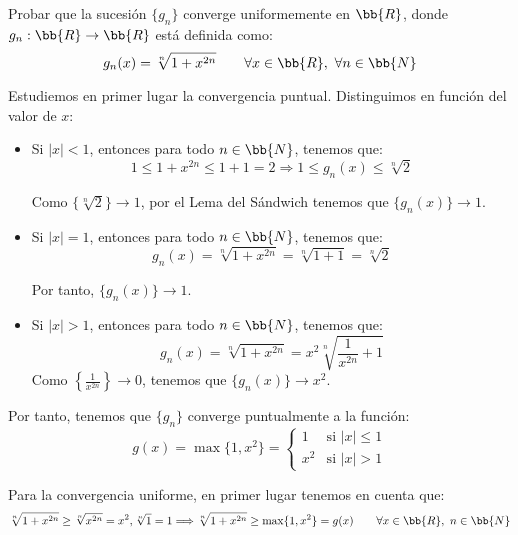 \begin{ejercicio}
    Probar que la sucesión $\{g_n\}$ converge uniformemente en $\bb{R}$, donde $g_n:\bb{R}\to \bb{R}$ está definida como:
    \begin{equation*}
        g_n(x) = \sqrt[n]{1+x^{2n}} \qquad \forall x\in \bb{R},~\forall n\in \bb{N}
    \end{equation*}

    Estudiemos en primer lugar la convergencia puntual. Distinguimos en función
    del valor de $x$:
    \begin{itemize}
        \item Si $|x| < 1$, entonces para todo $n\in \bb{N}$, tenemos que:
        \begin{equation*}
            1 \leq 1+x^{2n} \leq 1+1 = 2 \Longrightarrow 1 \leq g_n(x) \leq \sqrt[n]{2}
        \end{equation*}

        Como $\{\sqrt[n]{2}\}\to 1$, por el Lema del Sándwich tenemos que $\{g_n(x)\}\to 1$.

        \item Si $|x| = 1$, entonces para todo $n\in \bb{N}$, tenemos que:
        \begin{equation*}
            g_n(x) = \sqrt[n]{1+x^{2n}} = \sqrt[n]{1+1} = \sqrt[n]{2}
        \end{equation*}

        Por tanto, $\{g_n(x)\}\to 1$.

        \item Si $|x| > 1$, entonces para todo $n\in \bb{N}$, tenemos que:
        \begin{equation*}
            g_n(x) = \sqrt[n]{1+x^{2n}} = x^2\sqrt[n]{\frac{1}{x^{2n}}+1}
        \end{equation*}
        Como $\left\{\frac{1}{x^{2n}}\right\}\to 0$, tenemos que $\{g_n(x)\}\to x^2$.
    \end{itemize}

    Por tanto, tenemos que $\{g_n\}$ converge puntualmente a la función:
    \begin{equation*}
        g(x) = \max\{1,x^2\}= \begin{cases}
            1 & \text{si } |x| \leq 1\\
            x^2 & \text{si } |x| > 1
        \end{cases}
    \end{equation*}

    Para la convergencia uniforme, en primer lugar tenemos en cuenta que:
    \begin{equation*}
        \sqrt[n]{1+x^{2n}}\geq \sqrt[n]{x^{2n}}=x^2, \sqrt[n]{1}=1 \Longrightarrow \sqrt[n]{1+x^{2n}}\geq \max\{1,x^2\}=g(x)
        \qquad \forall x\in \bb{R},~n\in \bb{N}
    \end{equation*}


\end{ejercicio}
